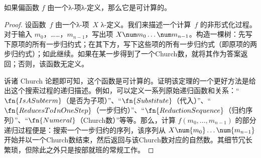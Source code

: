 \documentclass[../../../include/open-logic-section]{subfiles}
\begin{document}

\begin{thm}
如果偏函数 $f$ 由一个λ-项λ-定义，那么它是可计算的。
\end{thm}

\begin{proof}
设函数~$f$ 由一个λ-项~$X$ λ-定义。我们来描述一个计算~$f$ 的非形式化过程。对于输入 $m_0$，……，$m_{n-1}$，写出项 $X \num m_0 \ldots \num
m_{n-1}$。构造一棵树：先写下原项的所有一步归约式；在其下方，写下这些项的所有一步归约式（即原项的两步归约式）；如此继续。如果在某一步得到了一个Church数，就将其作为答案返回；否则，该函数无定义。

诉诸 Church 论题即可知，这个函数是可计算的。证明该定理的一个更好方法是给出这个搜索过程的递归描述。例如，可以定义一系列原始递归函数和关系：“$\fn{IsASubterm}$（是否为子项）”、“$\fn{Substitute}$（代入）”、“$\fn{ReducesToInOneStep}$（一步归约）”、“$\fn{ReductionSequence}$（归约序列）”、“$\fn{Numeral}$（Church数）”等等。那么，计算 $f(m_0, \dots, m_{n-1})$ 的部分递归过程便是：搜索一个一步归约的序列，该序列从 $X \num{m_0} \dots \num{m_{n-1}}$ 开始并以一个Church数结束，然后返回与该Church数对应的自然数。其细节冗长繁琐，但除此之外只是按部就班的常规工作。
\end{proof}
\end{document}
